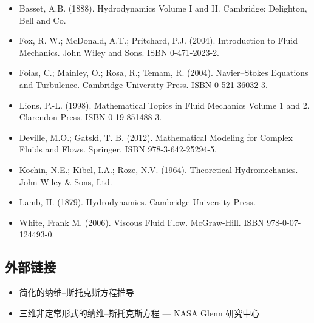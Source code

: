 \begin{itemize}
\item Basset, A.B. (1888). Hydrodynamics Volume I and II. Cambridge: Delighton, Bell and Co.
\item Fox, R. W.; McDonald, A.T.; Pritchard, P.J. (2004). Introduction to Fluid Mechanics. John Wiley and Sons. ISBN 0-471-2023-2.
\item Foias, C.; Mainley, O.; Rosa, R.; Temam, R. (2004). Navier–Stokes Equations and Turbulence. Cambridge University Press. ISBN 0-521-36032-3.
\item Lions, P.-L. (1998). Mathematical Topics in Fluid Mechanics Volume 1 and 2. Clarendon Press. ISBN 0-19-851488-3.
\item Deville, M.O.; Gatski, T. B. (2012). Mathematical Modeling for Complex Fluids and Flows. Springer. ISBN 978-3-642-25294-5.
\item Kochin, N.E.; Kibel, I.A.; Roze, N.V. (1964). Theoretical Hydromechanics. John Wiley & Sons, Ltd.
\item Lamb, H. (1879). Hydrodynamics. Cambridge University Press.
\item White, Frank M. (2006). Viscous Fluid Flow. McGraw-Hill. ISBN 978-0-07-124493-0.
\end{itemize}
\subsection{外部链接}
\begin{itemize}
\item 简化的纳维–斯托克斯方程推导
\item 三维非定常形式的纳维–斯托克斯方程 — NASA Glenn 研究中心
\end{itemize}
